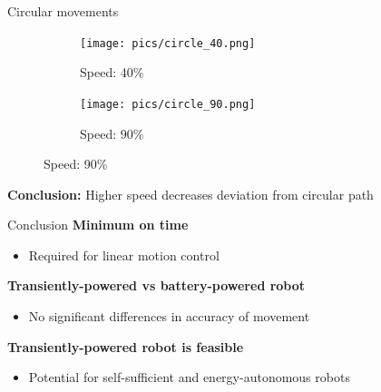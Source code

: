 \documentclass{beamer}
\begin{document}
\begin{frame}{Circular movements}
	\vspace{-1em}
	\begin{figure}[h!]
		\centering
		\begin{subfigure}[b]{0.49\textwidth}
			\texttt{[image: pics/circle\_40.png]}
			\caption*{Speed: 40\%}
		\end{subfigure}
		\begin{subfigure}[b]{0.49\textwidth}
			\texttt{[image: pics/circle\_90.png]}
			\caption*{Speed: 90\%}
		\end{subfigure}
	\end{figure}
	\pause
	\vspace{0.5em}
	\textbf{Conclusion:} Higher speed decreases deviation from circular path
\end{frame}

\begin{frame}{Conclusion}
	\textbf{Minimum on time} \\
	\begin{itemize}
		\item Required for linear motion control
	\end{itemize}
	\vspace{1em}
	\textbf{Transiently-powered vs battery-powered robot} \\
	\begin{itemize}
		\item No significant differences in accuracy of movement
	\end{itemize}
	\vspace{1em}
	\textbf{Transiently-powered robot is feasible} \\
	\begin{itemize}
		\item Potential for self-sufficient and energy-autonomous robots
	\end{itemize}
\end{frame}
\end{document}
